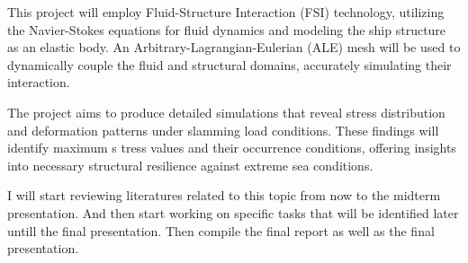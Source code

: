 \documentclass[a4paper,12pt]{article} %
\begin{document}
This project will employ Fluid-Structure Interaction (FSI) technology, utilizing the 
Navier-Stokes equations for fluid dynamics and modeling the ship structure as an elastic body. 
An Arbitrary-Lagrangian-Eulerian (ALE) mesh will be used to dynamically couple the fluid and 
structural domains, accurately simulating their interaction.

The project aims to produce detailed simulations that reveal stress distribution and 
deformation patterns under slamming load conditions. These findings will identify maximum s
tress values and their occurrence conditions, offering insights into necessary structural 
resilience against extreme sea conditions.

I will start reviewing literatures related to this topic from now to the midterm presentation.
And then start working on specific tasks that will be identified later untill the final presentation.
Then compile the final report as well as the final presentation.
\end{document}

